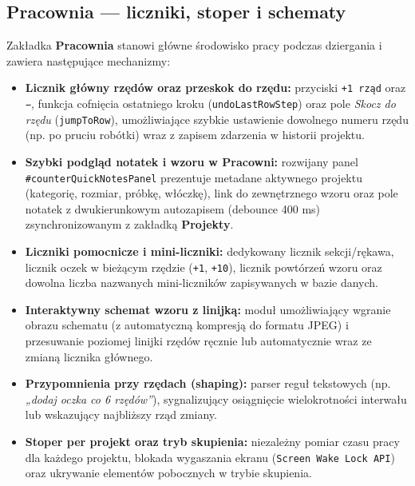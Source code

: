\documentclass[11pt, a4paper]{article}
\begin{document}
\subsection{Pracownia --- liczniki, stoper i schematy}
Zakładka \textbf{Pracownia} stanowi główne środowisko pracy podczas dziergania i zawiera następujące mechanizmy:
\begin{itemize}
  \item \textbf{Licznik główny rzędów oraz przeskok do rzędu:} przyciski \texttt{+1 rząd} oraz \texttt{−}, funkcja cofnięcia ostatniego kroku (\texttt{undoLastRowStep}) oraz pole \textit{Skocz do rzędu} (\texttt{jumpToRow}), umożliwiające szybkie ustawienie dowolnego numeru rzędu (np. po pruciu robótki) wraz z zapisem zdarzenia w historii projektu.
  \item \textbf{Szybki podgląd notatek i wzoru w Pracowni:} rozwijany panel \texttt{\#counterQuickNotesPanel} prezentuje metadane aktywnego projektu (kategorię, rozmiar, próbkę, włóczkę), link do zewnętrznego wzoru oraz pole notatek z dwukierunkowym autozapisem (debounce 400 ms) zsynchronizowanym z zakładką \textbf{Projekty}.
  \item \textbf{Liczniki pomocnicze i mini-liczniki:} dedykowany licznik sekcji/rękawa, licznik oczek w bieżącym rzędzie (\texttt{+1}, \texttt{+10}), licznik powtórzeń wzoru oraz dowolna liczba nazwanych mini-liczników zapisywanych w bazie danych.
  \item \textbf{Interaktywny schemat wzoru z linijką:} moduł umożliwiający wgranie obrazu schematu (z automatyczną kompresją do formatu JPEG) i przesuwanie poziomej linijki rzędów ręcznie lub automatycznie wraz ze zmianą licznika głównego.
  \item \textbf{Przypomnienia przy rzędach (shaping):} parser reguł tekstowych (np. \textit{„dodaj oczka co 6 rzędów”}), sygnalizujący osiągnięcie wielokrotności interwału lub wskazujący najbliższy rząd zmiany.
  \item \textbf{Stoper per projekt oraz tryb skupienia:} niezależny pomiar czasu pracy dla każdego projektu, blokada wygaszania ekranu (\texttt{Screen Wake Lock API}) oraz ukrywanie elementów pobocznych w trybie skupienia.
\end{itemize}
\end{document}
